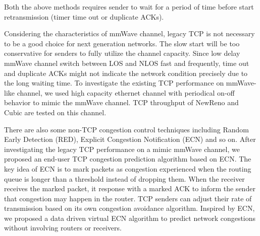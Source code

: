 Both the above methods requires sender to wait for a period of time before start retransmission (timer time out or duplicate ACKs).
\par Considering the characteristics of mmWave channel, legacy TCP is not necessary to be a good choice for next generation networks. The slow start will be too conservative for senders to fully utilize the channel capacity. Since low delay mmWave channel switch between LOS and NLOS fast and frequently, time out and duplicate ACKs might not indicate the network condition precisely due to the long waiting time. To investigate the existing TCP performance on mmWave-like channel, we used high capacity ethernet channel with periodical on-off behavior to mimic the mmWave channel. TCP throughput of NewReno and Cubic are tested on this channel. 
\par There are also some non-TCP congestion control techniques including Random Early Detection (RED), Explicit Congestion Notification (ECN) and so on. After investigating the legacy TCP performance on a mimic mmWave channel, we proposed an end-user TCP congestion prediction algorithm based on ECN. The key idea of ECN is to mark packets as congestion experienced when the routing queue is longer than a threshold instead of dropping them. When the receiver receives the marked packet, it response with a marked ACK to inform the sender that congestion may happen in the router. TCP senders can adjust their rate of transmission based on its own congestion avoidance algorithm. Inspired by ECN, we proposed a data driven virtual ECN algorithm to predict network congestions without involving routers or receivers.
